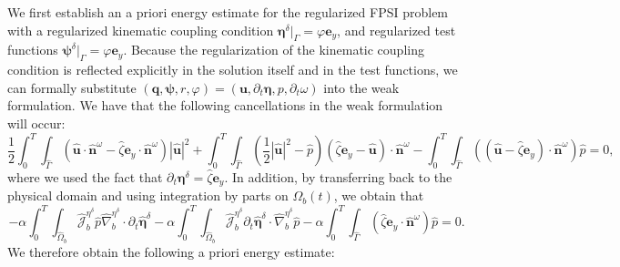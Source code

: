 \documentclass[11pt]{article}
\newcommand{\bd}{\boldsymbol}
\theoremstyle{definition}
\begin{document}
We first establish an a priori energy estimate for the regularized FPSI problem with a regularized kinematic coupling condition $\bd{\eta}^{\delta}|_{\Gamma} = \varphi \bd{e}_{y}$, and regularized test functions $\bd{\psi}^{\delta}|_{\Gamma} = \varphi \bd{e}_{y}$. Because the regularization of the kinematic coupling condition is reflected explicitly in the solution itself and in the test functions, we can formally substitute $(\bd{q}, \bd{\psi}, r, \varphi) = (\bd{u}, \partial_{t}\bd{\eta}, p, \partial_{t}\omega)$ into the weak formulation. We have that the following cancellations in the weak formulation will occur:
\begin{equation*}
\frac{1}{2} \int_{0}^{T} \int_{\hat{\Gamma}} (\hat{\bd{u}} \cdot \hat{\bd{n}}^{\omega} - \hat{\zeta} \bd{e}_{y} \cdot \hat{\bd{n}}^{\omega}) |\hat{\bd{u}}|^{2} + \int_{0}^{T} \int_{\hat{\Gamma}} \left(\frac{1}{2}|\hat{\bd{u}}|^{2} - \hat{p}\right) (\hat{\zeta}\bd{e}_{y} - \hat{\bd{u}}) \cdot \hat{\bd{n}}^{\omega} - \int_{0}^{T} \int_{\hat{\Gamma}} ((\hat{\bd{u}} - \hat{\zeta} \bd{e}_{y}) \cdot \hat{\bd{n}}^{\omega}) \hat{p} = 0,
\end{equation*}
where we used the fact that $\partial_{t}\bd{\eta}^{\delta} = \hat{\zeta} \bd{e}_{y}$. In addition, by transferring back to the physical domain and using integration by parts on $\Omega_{b}(t)$, we obtain that 
\begin{equation*}
-\alpha \int_{0}^{T} \int_{\hat{\Omega}_{b}} \hat{\mathcal{J}}^{\eta^{\delta}}_{b} \hat{p} \hat{\nabla}^{\eta^{\delta}}_{b} \cdot \partial_{t}\hat{\bd{\eta}}^{\delta} - \alpha \int_{0}^{T} \int_{\hat{\Omega}_{b}} \hat{\mathcal{J}}^{\eta^{\delta}}_{b} \partial_{t} \hat{\bd{\eta}}^{\delta} \cdot \hat{\nabla}^{\eta^{\delta}}_{b} \hat{p} - \alpha \int_{0}^{T} \int_{\hat{\Gamma}} (\hat{\zeta} \bd{e}_{y} \cdot \hat{\bd{n}}^{\omega}) \hat{p} = 0.
\end{equation*}
We therefore obtain the following a priori energy estimate:
\end{document}
